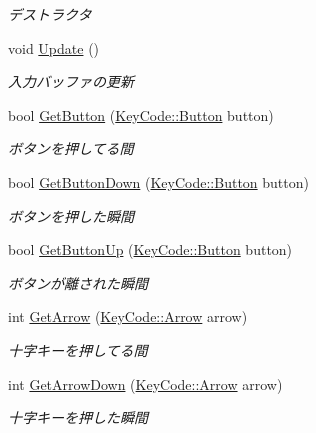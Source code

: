 \begin{DoxyCompactItemize}
\begin{DoxyCompactList}\small\item\em デストラクタ \end{DoxyCompactList}\item 
void \hyperlink{class_game_pad_abceb475ea9190c464949b0b1eb107ad7}{Update} ()
\begin{DoxyCompactList}\small\item\em 入力バッファの更新 \end{DoxyCompactList}\item 
bool \hyperlink{class_game_pad_ae00b045e64eba60d8ef94c968081fd47}{Get\+Button} (\hyperlink{namespace_key_code_a03bfec859eac87be20f8952c1eb89de0}{Key\+Code\+::\+Button} button)
\begin{DoxyCompactList}\small\item\em ボタンを押してる間 \end{DoxyCompactList}\item 
bool \hyperlink{class_game_pad_a94ffaf6f2cd3c029eeef56c47b5f43d6}{Get\+Button\+Down} (\hyperlink{namespace_key_code_a03bfec859eac87be20f8952c1eb89de0}{Key\+Code\+::\+Button} button)
\begin{DoxyCompactList}\small\item\em ボタンを押した瞬間 \end{DoxyCompactList}\item 
bool \hyperlink{class_game_pad_ae723fb4c3c30029bca94434ec97f3def}{Get\+Button\+Up} (\hyperlink{namespace_key_code_a03bfec859eac87be20f8952c1eb89de0}{Key\+Code\+::\+Button} button)
\begin{DoxyCompactList}\small\item\em ボタンが離された瞬間 \end{DoxyCompactList}\item 
int \hyperlink{class_game_pad_a557491a956947e431f5b4b8cb94650d1}{Get\+Arrow} (\hyperlink{namespace_key_code_a16ba82423f2a8ac640d047568347eee4}{Key\+Code\+::\+Arrow} arrow)
\begin{DoxyCompactList}\small\item\em 十字キーを押してる間 \end{DoxyCompactList}\item 
int \hyperlink{class_game_pad_accfd004a64647f1bdc2f6e844ddb8c64}{Get\+Arrow\+Down} (\hyperlink{namespace_key_code_a16ba82423f2a8ac640d047568347eee4}{Key\+Code\+::\+Arrow} arrow)
\begin{DoxyCompactList}\small\item\em 十字キーを押した瞬間 \end{DoxyCompactList}\item 

\end{DoxyCompactItemize}
